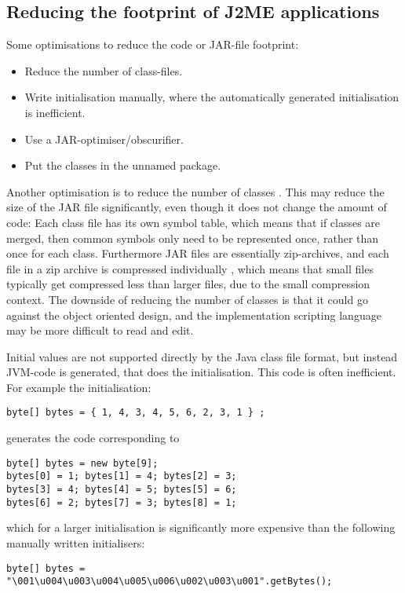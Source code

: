 \documentclass[11pt]{report}
\begin{document}
\subsection{Reducing the footprint of J2ME applications}
Some optimisations to reduce the code or JAR-file footprint:
\begin{itemize}
\item Reduce the number of class-files.
\item Write initialisation manually, where the automatically generated initialisation is inefficient.
\item Use a JAR-optimiser/obscurifier.
\item Put the classes in the unnamed package.
\end{itemize}

Another optimisation is to reduce the number of classes \cite{nokia-optim, kahlua-thesis}.
This may reduce the size of the JAR file significantly,
even though it does not change the amount of code:
Each class file has its own symbol table, which means that if classes are merged, then common symbols only need to be represented once, rather than once for each class.
Furthermore JAR files are essentially zip-archives, and each file in a zip archive is compressed individually \cite{zipspec}, which means that small files typically get compressed less than larger files, due to the small compression context.
The downside of reducing the number of classes is that it could go against the object oriented design, and the implementation scripting language may be more difficult to read and edit. 

Initial values are not supported directly by the Java class file format, but instead
JVM-code is generated, that does the initialisation. 
This code is often inefficient. For example the initialisation:
\begin{verbatim}
byte[] bytes = { 1, 4, 3, 4, 5, 6, 2, 3, 1 } ;
\end{verbatim}
generates the code corresponding to
\begin{verbatim}
byte[] bytes = new byte[9];
bytes[0] = 1; bytes[1] = 4; bytes[2] = 3;
bytes[3] = 4; bytes[4] = 5; bytes[5] = 6;
bytes[6] = 2; bytes[7] = 3; bytes[8] = 1;
\end{verbatim}
which for a larger initialisation is significantly more expensive than the following manually written initialisers:
\begin{verbatim}
byte[] bytes = "\001\u004\u003\u004\u005\u006\u002\u003\u001".getBytes();
\end{verbatim}
\end{document}
